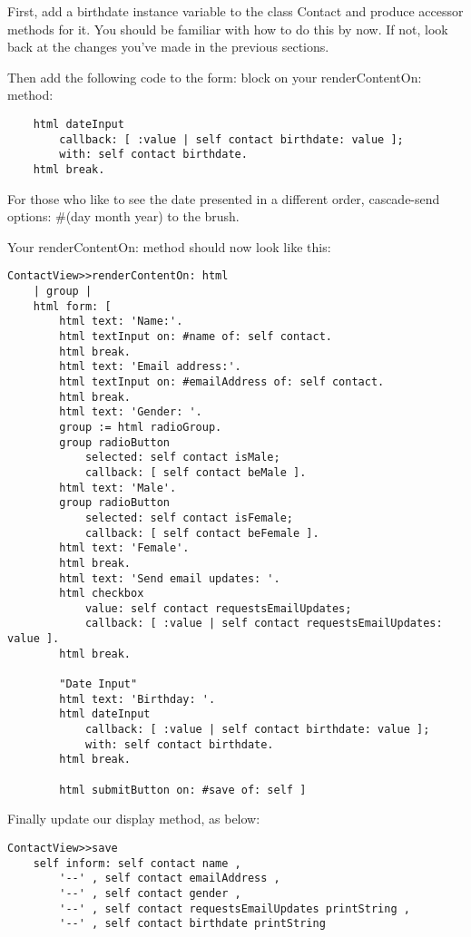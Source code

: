 \documentclass[a4paper,10pt,twoside]{book}
\newcommand{\ct}[1]{{\small\ttfamily\textup{#1}}}
\begin{document}
First, add a \ct{birthdate} instance variable to the class  \ct{Contact} and produce accessor methods for it. You should be familiar with how to do this by now. If not, look back at the changes you've made in the previous sections.

Then add the following code to the  \ct{form:} block on your \ct{renderContentOn:} method:

\begin{lstlisting}
    html dateInput
        callback: [ :value | self contact birthdate: value ];
        with: self contact birthdate.
    html break.
\end{lstlisting}

For those who like to see the date presented in a different order, cascade-send \ct{options: \#(day month year)} to the brush.

Your \ct{renderContentOn:} method should now look like this:

\begin{lstlisting}
ContactView>>renderContentOn: html
    | group |
    html form: [
        html text: 'Name:'.
        html textInput on: #name of: self contact.
        html break.
        html text: 'Email address:'.
        html textInput on: #emailAddress of: self contact.
        html break.
        html text: 'Gender: '.
        group := html radioGroup.
        group radioButton
            selected: self contact isMale;
            callback: [ self contact beMale ].
        html text: 'Male'.
        group radioButton
            selected: self contact isFemale;
            callback: [ self contact beFemale ].
        html text: 'Female'.
        html break.
        html text: 'Send email updates: '.
        html checkbox
            value: self contact requestsEmailUpdates;
            callback: [ :value | self contact requestsEmailUpdates: value ].
        html break.

        "Date Input"
        html text: 'Birthday: '.
        html dateInput
            callback: [ :value | self contact birthdate: value ];
            with: self contact birthdate.
        html break.

        html submitButton on: #save of: self ]
\end{lstlisting}

Finally update our display method, as below:

\begin{lstlisting}
ContactView>>save
    self inform: self contact name ,
        '--' , self contact emailAddress ,
        '--' , self contact gender ,
        '--' , self contact requestsEmailUpdates printString ,
        '--' , self contact birthdate printString
\end{lstlisting}
\end{document}
